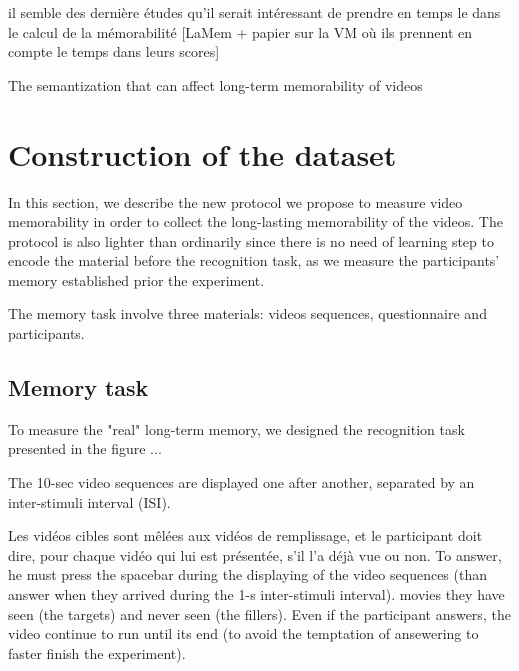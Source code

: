 \documentclass[sigconf]{acmart}
\begin{document}
il semble des dernière études qu'il serait intéressant de prendre en temps le dans le calcul de la mémorabilité [LaMem + papier sur la VM où ils prennent en compte le temps dans leurs scores]

The semantization that can affect long-term memorability of videos


\section{Construction of the dataset}
In this section, we describe the new protocol we propose to measure video memorability in order to collect the long-lasting memorability of the videos.
The protocol is also lighter than ordinarily since there is no need of learning step to encode the material before the recognition task, as we measure the participants' memory established prior the experiment.

The memory task involve three materials: videos sequences, questionnaire and participants.


\subsection{Memory task}
To measure the "real" long-term memory, we designed the recognition task presented in the figure ...%

The 10-sec video sequences are displayed one after another, separated by an inter-stimuli interval (ISI).

Les vidéos cibles sont mêlées aux vidéos de remplissage, et le participant doit dire, pour chaque vidéo qui lui est présentée, s’il l’a déjà vue ou non.
To answer, he must press the spacebar during the displaying of the video sequences (than answer when they arrived during the 1-s inter-stimuli interval).
movies they have seen (the targets) and never seen (the fillers).
Even if the participant answers, the video continue to run until its end (to avoid the temptation of ansewering to faster finish the experiment).
\end{document}
